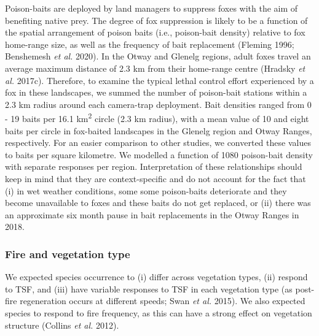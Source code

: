 \documentclass[11pt,a4paper,titlepage,twoside,openright]{style/unimelbthesis}
\begin{document}
\begin{mainmatter}
Poison-baits are deployed by land managers to suppress foxes with the aim of benefiting native prey. The degree of fox suppression is likely to be a function of the spatial arrangement of poison baits (i.e., poison-bait density) relative to fox home-range size, as well as the frequency of bait replacement (Fleming 1996; Benshemesh \emph{et al.} 2020). In the Otway and Glenelg regions, adult foxes travel an average maximum distance of 2.3 km from their home-range centre (Hradsky \emph{et al.} 2017c). Therefore, to examine the typical lethal control effort experienced by a fox in these landscapes, we summed the number of poison-bait stations within a 2.3 km radius around each camera-trap deployment. Bait densities ranged from 0 - 19 baits per 16.1 km\textsuperscript{2} circle (2.3 km radius), with a mean value of 10 and eight baits per circle in fox-baited landscapes in the Glenelg region and Otway Ranges, respectively. For an easier comparison to other studies, we converted these values to baits per square kilometre. We modelled a function of 1080 poison-bait density with separate responses per region. Interpretation of these relationships should keep in mind that they are context-specific and do not account for the fact that (i) in wet weather conditions, some some poison-baits deteriorate and they become unavailable to foxes and these baits do not get replaced, or (ii) there was an approximate six month pause in bait replacements in the Otway Ranges in 2018.

\hypertarget{fire-and-vegetation-type}{%
\subsubsection{Fire and vegetation type}\label{fire-and-vegetation-type}}

We expected species occurrence to (i) differ across vegetation types, (ii) respond to TSF, and (iii) have variable responses to TSF in each vegetation type (as post-fire regeneration occurs at different speeds; Swan \emph{et al.} 2015). We also expected species to respond to fire frequency, as this can have a strong effect on vegetation structure (Collins \emph{et al.} 2012).


\end{mainmatter}
\end{document}
